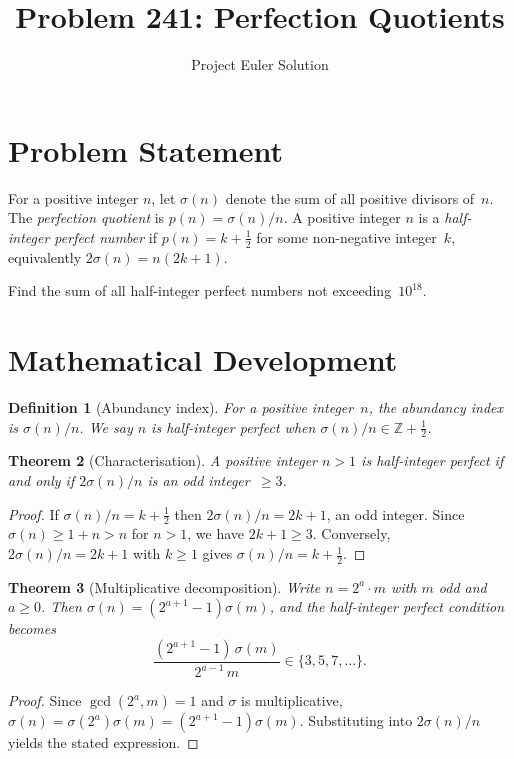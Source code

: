 \documentclass[12pt]{article}
\title{Problem 241: Perfection Quotients}
\author{Project Euler Solution}
\date{}
\newtheorem{theorem}{Theorem}
\newtheorem{definition}[theorem]{Definition}
\begin{document}
\maketitle

\section{Problem Statement}

For a positive integer $n$, let $\sigma(n)$ denote the sum of all positive divisors of~$n$. The \emph{perfection quotient} is $p(n)=\sigma(n)/n$. A positive integer $n$ is a \emph{half-integer perfect number} if $p(n)=k+\tfrac{1}{2}$ for some non-negative integer~$k$, equivalently $2\sigma(n)=n(2k+1)$.

Find the sum of all half-integer perfect numbers not exceeding~$10^{18}$.

\section{Mathematical Development}

\begin{definition}[Abundancy index]
For a positive integer~$n$, the abundancy index is $\sigma(n)/n$. We say $n$ is half-integer perfect when $\sigma(n)/n\in\mathbb{Z}+\tfrac{1}{2}$.
\end{definition}

\begin{theorem}[Characterisation]\label{thm:char}
A positive integer $n>1$ is half-integer perfect if and only if $2\sigma(n)/n$ is an odd integer~$\ge 3$.
\end{theorem}

\begin{proof}
If $\sigma(n)/n=k+\tfrac{1}{2}$ then $2\sigma(n)/n=2k+1$, an odd integer. Since $\sigma(n)\ge 1+n>n$ for $n>1$, we have $2k+1\ge 3$. Conversely, $2\sigma(n)/n=2k+1$ with $k\ge 1$ gives $\sigma(n)/n=k+\tfrac{1}{2}$.
\end{proof}

\begin{theorem}[Multiplicative decomposition]\label{thm:decomp}
Write $n=2^a\cdot m$ with $m$ odd and $a\ge 0$. Then $\sigma(n)=(2^{a+1}-1)\sigma(m)$, and the half-integer perfect condition becomes
\[
\frac{(2^{a+1}-1)\,\sigma(m)}{2^{a-1}\,m}\in\{3,5,7,\ldots\}.
\]
\end{theorem}

\begin{proof}
Since $\gcd(2^a,m)=1$ and $\sigma$ is multiplicative, $\sigma(n)=\sigma(2^a)\sigma(m)=(2^{a+1}-1)\sigma(m)$. Substituting into $2\sigma(n)/n$ yields the stated expression.
\end{proof}
\end{document}
